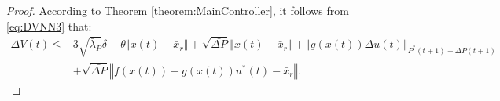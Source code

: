 \documentclass[1p,times]{elsarticle}
\begin{document}
\begin{proof}

According to Theorem \ref{theorem:MainController}, it follows from \eqref{eq:DVNN3} that:
\begin{align}\label{eq:DVNN4}
\Delta V(t)\leq&{3\sqrt{\bar{\lambda}_P}\delta}-\theta\left\Vert x(t)-\bar{x}_r\right\Vert+\sqrt{\bar{\Delta{P}}}\left\Vert x(t)-\bar{x}_r\right\Vert+\left\Vert g\left(x(t)\right)\Delta{u(t)}\right\Vert_{P^\ast(t+1)+\Delta{P(t+1)}}\nonumber\\
&+\sqrt{\bar{\Delta{P}}}\left\Vert f\left(x(t)\right)+g\left(x(t)\right)u^\ast(t)-\bar{x}_r\right\Vert.
\end{align}





\end{proof}
\end{document}

